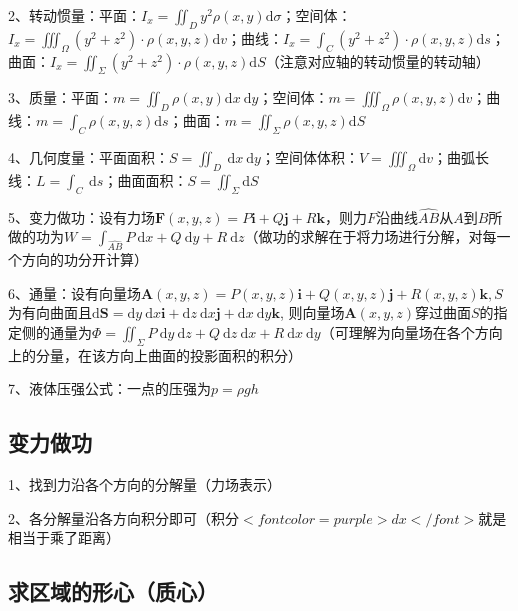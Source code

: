 2、转动惯量：平面：$ I_{x}=\iint_{D} y^{2} \rho(x, y) \mathrm{d} \sigma $；空间体：$ I_{x}=\iiint_{\Omega}\left(y^{2}+z^{2}\right) \cdot \rho(x, y, z) \mathrm{d} v $；曲线：$ I_{x}=\int_{C}\left(y^{2}+z^{2}\right) \cdot \rho(x, y, z) \mathrm{d} s $；曲面：$ I_{x}=\iint_{\Sigma}\left(y^{2}+z^{2}\right) \cdot \rho(x, y, z) \mathrm{d} S $（注意对应轴的转动惯量的转动轴）

3、质量：平面：$ m=\iint_{D} \rho(x, y) \mathrm{d} x \mathrm{~d} y $；空间体：$ m=\iiint_{\Omega} \rho(x, y, z) \mathrm{d} v $；曲线：$ m=\int_{C} \rho(x, y, z) \mathrm{d} s $；曲面：$ m=\iint_{\Sigma} \rho(x, y, z) \mathrm{d} S $

4、几何度量：平面面积：$ S=\iint_{D} \mathrm{~d} x \mathrm{~d} y $；空间体体积：$ V=\iiint_{\Omega} \mathrm{d} v $；曲弧长线：$ L=\int_{C} \mathrm{~d} s $；曲面面积：$ S=\iint_{\Sigma} \mathrm{d} S $

5、变力做功：设有力场$ \boldsymbol{F}(x, y, z)=P \boldsymbol{i}+Q \boldsymbol{j}+R \boldsymbol{k} $，则力$ F $沿曲线$ \widehat{A B} $从$ A $到$ B $所做的功为$ W=\int_{\widehat{A B}} P \mathrm{~d} x+Q \mathrm{~d} y+R \mathrm{~d} z $（做功的求解在于将力场进行分解，对每一个方向的功分开计算）

6、通量：设有向量场$ \boldsymbol{A}(x, y, z)=P(x, y, z) \boldsymbol{i}+Q(x, y, z) \boldsymbol{j}+R(x, y, z) \boldsymbol{k}, S $为有向曲面且$ \mathrm{d} \boldsymbol{S}=\mathrm{d} y \mathrm{~d} x \boldsymbol{i}+\mathrm{d} z \mathrm{~d} x \boldsymbol{j}+\mathrm{d} x \mathrm{~d} y \boldsymbol{k} $, 则向量场$ \boldsymbol{A}(x, y, z) $穿过曲面$ S $的指定侧的通量为$ \Phi=\iint_{\Sigma} P \mathrm{~d} y \mathrm{~d} z+Q \mathrm{~d} z \mathrm{~d} x+R \mathrm{~d} x \mathrm{~d} y $（可理解为向量场在各个方向上的分量，在该方向上曲面的投影面积的积分）

7、液体压强公式：一点的压强为$ p=\rho gh $



\subsection{变力做功}

1、找到力沿各个方向的分解量（力场表示）

2、各分解量沿各方向积分即可（积分$ <font color=purple>dx</font> $就是相当于乘了距离）



\subsection{求区域的形心（质心）}

